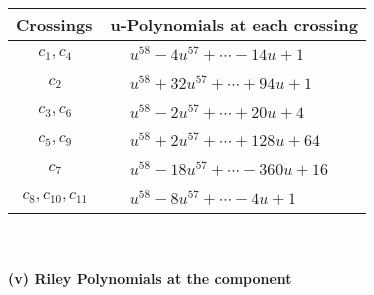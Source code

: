 \documentclass[1p]{elsarticle_modified}
\theoremstyle{definition}
\begin{document}
\begin{tabular}{m{50pt}|m{274pt}}
Crossings & \hspace{64pt}u-Polynomials at each crossing \\
\hline $$\begin{aligned}c_{1},c_{4}\end{aligned}$$&$\begin{aligned}
&u^{58}-4 u^{57}+\cdots-14 u+1
\end{aligned}$\\
\hline $$\begin{aligned}c_{2}\end{aligned}$$&$\begin{aligned}
&u^{58}+32 u^{57}+\cdots+94 u+1
\end{aligned}$\\
\hline $$\begin{aligned}c_{3},c_{6}\end{aligned}$$&$\begin{aligned}
&u^{58}-2 u^{57}+\cdots+20 u+4
\end{aligned}$\\
\hline $$\begin{aligned}c_{5},c_{9}\end{aligned}$$&$\begin{aligned}
&u^{58}+2 u^{57}+\cdots+128 u+64
\end{aligned}$\\
\hline $$\begin{aligned}c_{7}\end{aligned}$$&$\begin{aligned}
&u^{58}-18 u^{57}+\cdots-360 u+16
\end{aligned}$\\
\hline $$\begin{aligned}c_{8},c_{10},c_{11}\end{aligned}$$&$\begin{aligned}
&u^{58}-8 u^{57}+\cdots-4 u+1
\end{aligned}$\\
\hline
\end{tabular}\\~\\
\newpage\renewcommand{\arraystretch}{1}
\flushleft \textbf{(v) Riley Polynomials at the component}\newline \\
\end{document}

